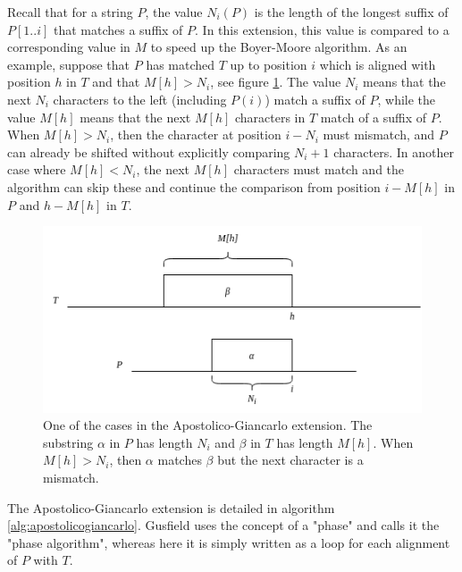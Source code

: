 Recall that for a string $P$, the value $N_i(P)$ is the length of the longest suffix of $P[1..i]$ that matches a suffix of $P$. In this extension, this value is compared to a corresponding value in $M$ to speed up the Boyer-Moore algorithm. As an example, suppose that $P$ has matched $T$ up to position $i$ which is aligned with position $h$ in $T$ and that $M[h]>N_i$, see figure \ref{fig:Apostolicocase}. The value $N_i$ means that the next $N_i$ characters to the left (including $P(i)$) match a suffix of $P$, while the value $M[h]$ means that the next $M[h]$ characters in $T$ match of a suffix of $P$. When $M[h]>N_i$, then the character at position $i-N_i$ must mismatch, and $P$ can already be shifted without explicitly comparing $N_i+1$ characters. In another case where $M[h]<N_i$, the next $M[h]$ characters must match and the algorithm can skip these and continue the comparison from position $i-M[h]$ in $P$ and $h-M[h]$ in $T$. 

\begin{figure}[th!]
    \centering
    \includegraphics[width=.9\textwidth]{LaTeX/Figures/Zalg/Apostolicocase.png}
    \caption{One of the cases in the Apostolico-Giancarlo extension. The substring $\alpha$ in $P$ has length $N_i$ and $\beta$ in $T$ has length $M[h]$. When $M[h]>N_i$, then $\alpha$ matches $\beta$ but the next character is a mismatch. }
    \label{fig:Apostolicocase}
\end{figure}

The Apostolico-Giancarlo extension is detailed in algorithm \ref{alg:apostolicogiancarlo}. Gusfield\cite{Gusfield1997AlgorithmsOS} uses the concept of a "phase" and calls it the "phase algorithm", whereas here it is simply written as a loop for each alignment of $P$ with $T$. 

